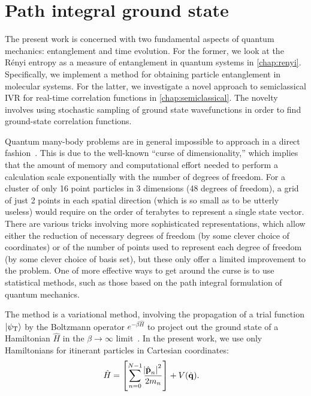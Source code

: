 \section{Path integral ground state}

The present work is concerned with two fundamental aspects of quantum mechanics: entanglement and time evolution.
For the former, we look at the Rényi entropy as a measure of entanglement in quantum systems in \cref{chap:renyi}.
Specifically, we implement a method for obtaining particle entanglement in molecular systems.
For the latter, we investigate a novel approach to semiclassical IVR for real-time correlation functions in \cref{chap:semiclassical}.
The novelty involves using stochastic sampling of ground state wavefunctions in order to find ground-state correlation functions.

Quantum many-body problems are in general impossible to approach in a direct fashion~\cite[391-392]{tuckerman2010statistical}.
This is due to the well-known ``curse of dimensionality,'' which implies that the amount of memory and computational effort needed to perform a calculation scale exponentially with the number of degrees of freedom.
For a cluster of only 16 point particles in 3 dimensions (48 degrees of freedom), a grid of just 2 points in each spatial direction (which is so small as to be utterly useless) would require on the order of terabytes to represent a single state vector.
There are various tricks involving more sophisticated representations, which allow either the reduction of necessary degrees of freedom (by some clever choice of coordinates) or of the number of points used to represent each degree of freedom (by some clever choice of basis set), but these only offer a limited improvement to the problem.
One of more effective ways to get around the curse is to use statistical methods, such as those based on the path integral formulation of quantum mechanics.

The  method is a variational method, involving the propagation of a trial function $\ket{\psi_\mathrm{T}}$ by the Boltzmann operator $e^{-\beta \hat{H}}$ to project out the ground state of a Hamiltonian $\hat{H}$ in the $\beta \to \infty$ limit~\cite{sarsa2000pigs}.
In the present work, we use only Hamiltonians for itinerant particles in Cartesian coordinates:
\begin{align}
	\hat{H}
	&= \left[ \sum_{n=0}^{N-1} \frac{\abs{\hat{\bm{\mathbf{p}}}_n}^2}{2 m_n} \right]
		+ V(\hat{\bm{\mathbf{q}}}).
\end{align}


